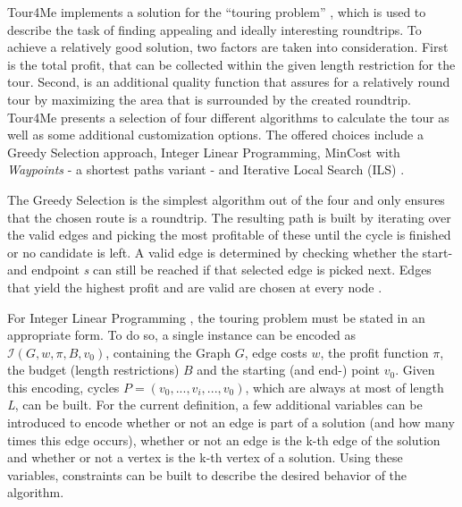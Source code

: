 Tour4Me implements a solution for the \enquote{touring problem} , which is used to describe the task of finding appealing and ideally interesting roundtrips.
To achieve a relatively good solution, two factors are taken into consideration.
First is the total profit, that can be collected within the given length restriction for the tour.
Second, is an additional quality function that assures for a relatively round tour by maximizing the area that is surrounded by the created roundtrip.
Tour4Me presents a selection of four different algorithms to calculate the tour as well as some additional customization options.
The offered choices include a Greedy Selection approach, Integer Linear Programming, MinCost with \textit{Waypoints} - a shortest paths variant - and Iterative Local Search (ILS) \cite{buchin_tour4me_2022}. 

The Greedy Selection \cite{buchin_tour4me_2022, wayahdi_greedy_2021} is the simplest algorithm out of the four and only ensures that the chosen route is a roundtrip.
The resulting path is built by iterating over the valid edges and picking the most profitable of these until the cycle is finished or no candidate is left.
A valid edge is determined by checking whether the start- and endpoint \textit{s} can still be reached if that selected edge is picked next. 
Edges that yield the highest profit and are valid are chosen at every node \cite{buchin_tour4me_2022, wayahdi_greedy_2021} .


For Integer Linear Programming \cite{buchin_tour4me_2022, graver_foundations_1975}, the touring problem must be stated in an appropriate form.
To do so, a single instance can be encoded as $\mathcal{I}(G, w, \pi, B, v_0)$, containing the Graph $G$, edge costs $w$, the profit function $\pi$, the budget (length restrictions) $B$ and the starting (and end-) point $v_0$.
Given this encoding, cycles $P=(v_0,...,v_i,...,v_0)$, which are always at most of length \textit{L}, can be built.
For the current definition, a few additional variables can be introduced to encode whether or not an edge is part of a solution (and how many times this edge occurs), whether or not an edge is the k-th edge of the solution and whether or not a vertex is the k-th vertex of a solution. 
Using these variables, constraints can be built to describe the desired behavior of the algorithm.

